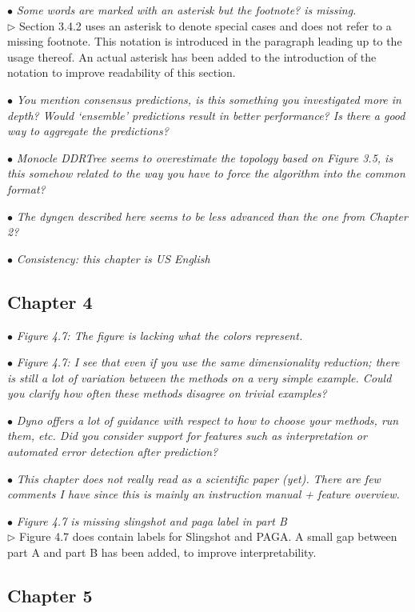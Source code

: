 \documentclass[10pt]{article}
\newcommand{\exam}[2][\  ]{\hspace{0pt}\marginpar{\color{red}#1}$\bullet$ \textit{#2}}
\newcommand{\imp}[1]{{\color{red} #1}}
\newcommand{\answ}[1]{{\color{blue} $\triangleright$ #1}}
\newcommand{\bigexclaim}{\raisebox{-0.1em}{\BigTriangleUp}\hspace{-0.32em}\llap{\small\textbf{!}}\hspace{0.32em}}
\newcommand{\tagimp}{\bigexclaim}
\newcommand{\tagtime}{{\Large $\hourglass$}}
\begin{document}
{\exam{Some words are marked with an asterisk but the footnote? is
	missing.} \\
\answ{Section 3.4.2 uses an asterisk to denote special cases and does not refer to a missing footnote. This notation is introduced in the paragraph leading up to the usage thereof. An actual asterisk has been added to the introduction of the notation to improve readability of this section.}

\exam{You mention consensus predictions, is this something you investigated more
		in depth? Would ‘ensemble’ predictions result in better performance? Is there
		a good way to aggregate the predictions?}

\exam{Monocle DDRTree seems to overestimate the topology based on Figure 3.5, is
	this somehow related to the way you have to force the algorithm into the
	common format?}

\exam{The dyngen described here seems to be less advanced than the one from
		Chapter 2?}

\exam[\tagtime]{Consistency: this chapter is US English}


\subsection{Chapter 4}

\exam{Figure 4.7: The figure is lacking what the colors represent.}

\exam{Figure 4.7: I see that even if you use the same dimensionality
	reduction; there is still a lot of variation between the methods on a very simple
	example. Could you clarify
	how often these methods disagree on trivial examples?}

\exam{Dyno offers a lot of
	guidance with respect to how to choose your methods, run them, etc. Did you
	consider support for features such as interpretation or automated error
	detection after prediction?}


\exam[\tagimp \tagtime]{\imp{This chapter does not really read as a scientific paper (yet).} There are few
	comments I have since this is mainly an instruction manual + feature overview.}



\exam{Figure 4.7 is missing slingshot and paga label in part B} \\
\answ{Figure 4.7 does contain labels for Slingshot and PAGA. A small gap between part A and part B has been added, to improve interpretability.}


\subsection{Chapter 5}

}
\end{document}
